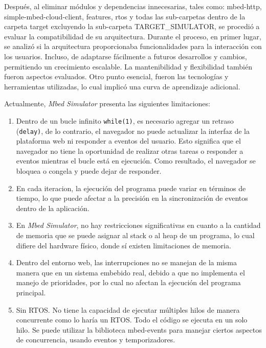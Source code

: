Después, al eliminar módulos y dependencias innecesarias, tales como: mbed-http, simple-mbed-cloud-client, features, rtos y todas las sub-carpetas dentro de la carpeta \textquotedbl target\textquotedbl{}  excluyendo la sub-carpeta TARGET\_SIMULATOR, se procedió a evaluar la compatibilidad de su arquitectura. Durante el proceso, en primer lugar, se analizó si la arquitectura proporcionaba funcionalidades para la interacción con los usuarios. Incluso, de adaptarse fácilmente a futuros desarrollos y cambios, permitiendo un crecimiento escalable. La mantenibilidad y flexibilidad también fueron aspectos evaluados. Otro punto esencial, fueron las tecnologías y herramientas utilizadas, lo cual implicó una curva de aprendizaje adicional. 

Actualmente, \textit{Mbed Simulator} presenta las siguientes limitaciones:

\begin{enumerate}
	\item Dentro de un bucle infinito \texttt{while(1)}, es necesario agregar un retraso \newline(\texttt{delay)}, de lo contrario, el navegador no puede actualizar la interfaz de la plataforma web ni responder a eventos del usuario. Esto significa que el navegador no tiene la oportunidad de realizar otras tareas o responder a eventos mientras el bucle está en ejecución. Como resultado, el navegador se bloquea o congela y puede dejar de responder.
	
	\item En cada iteracion, la ejecución del programa puede variar en términos de tiempo, lo que puede afectar a la precisión en la sincronización de eventos dentro de la aplicación.

	\item En \textit{Mbed Simulator}, no hay restricciones significativas en cuanto a la cantidad de memoria que se puede asignar al stack o al heap  de un programa, lo cual difiere del hardware físico, donde sí existen limitaciones de memoria.
	
	\item Dentro del entorno web, las interrupciones no se manejan de la misma manera que en un sistema embebido real, debido a que no implementa el manejo de prioridades, por lo cual no afectan la ejecución del programa principal.
	
	\item Sin RTOS. No tiene la capacidad de ejecutar múltiples hilos de manera concurrente como lo haría un RTOS. Todo el código se ejecuta en un solo hilo. Se puede utilizar la biblioteca mbed-events para manejar ciertos aspectos de concurrencia, usando eventos y temporizadores.

\end{enumerate}

